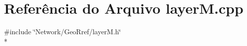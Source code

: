 \section{Referência do Arquivo layer\+M.\+cpp}
\label{layer_m_8cpp}
{\ttfamily \#include \char`\"{}Network/\+Geo\+Rref/layer\+M.\+h\char`\"{}}\\*
